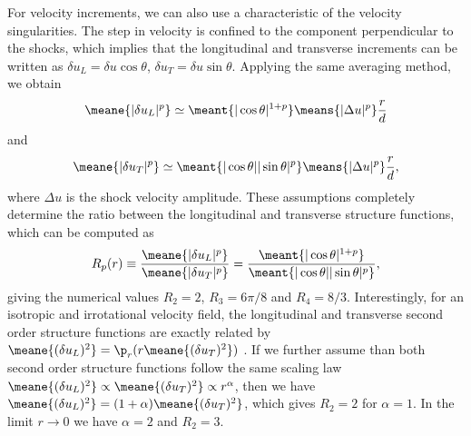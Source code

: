 For velocity increments, we can also use a characteristic of the
velocity singularities.  The step in velocity is confined to  the component
perpendicular to the shocks, which implies that the longitudinal and
transverse increments can be written as  $\delta u_L = \delta u
\cos\theta$, $\delta u_T = \delta u \sin\theta$.
%
Applying the same averaging method, we obtain
\begin{equation} \label{StepL}
\meane{|\delta u_L|^p} 
\simeq 
\meant{|\cos\theta|^{1+p}}
\means{|\Delta u |^p} \frac{r}{d}
\end{equation}
and
\begin{equation} \label{StepT} 
\meane{|\delta u_T|^p} 
\simeq 
\meant{|\cos\theta||\sin\theta|^{p}}
\means{|\Delta u |^p} \frac{r}{d},
\end{equation}
where $\Delta u $ is the shock velocity amplitude.
%
These assumptions completely determine the ratio between the
longitudinal and transverse structure functions, which can be computed as
\begin{eqnarray} \label{Ratio}
R_p(r) \equiv \frac{\meane{|\delta u_L|^p}}{\meane{|\delta u_T|^p}} = 
\frac{\meant{|\cos\theta|^{1+p}}}{\meant{|\cos\theta||\sin\theta|^p}},
\end{eqnarray}
giving the numerical values $R_2 = 2$, $R_3 = 6\pi/8$ and $R_4 = 8/3$.
Interestingly, for an isotropic and irrotational velocity field, the longitudinal and transverse second order structure functions
are exactly related by $\meane{(\delta u_L)^2} = \p_r( r\meane{(\delta
u_T)^2} )$ \cite[]{Lindborg2007jas}. If we further assume than both second order structure functions follow
the same scaling law $\meane{ (\delta u_L)^2} \propto \meane{ (\delta
u_T)^2} \propto r^\alpha$, then we have $\meane{ (\delta u_L)^2} =
(1+\alpha) \meane{ (\delta u_T)^2} $, which gives $ R_2 = 2 $ for 
$  \alpha = 1$.  In the limit $ r \rightarrow 0 $ we have $ \alpha = 2 $ and $ R_2 = 3 $.
%


